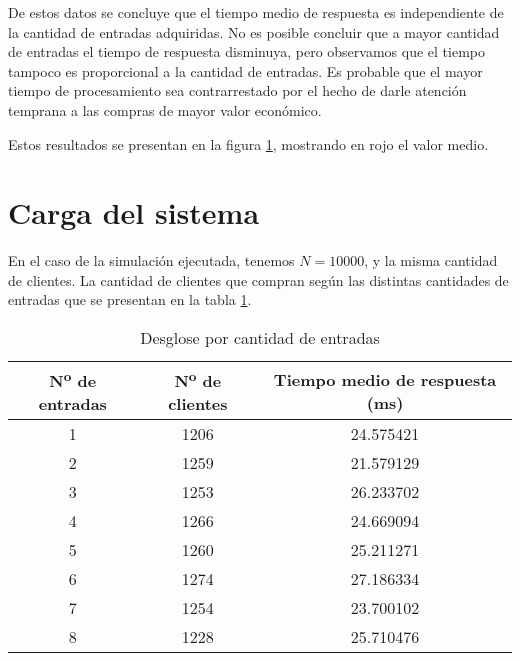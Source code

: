De estos datos se concluye que el tiempo medio de respuesta es independiente de la cantidad de entradas adquiridas.
No es posible concluir que a mayor cantidad de entradas el tiempo de respuesta disminuya, pero observamos que el tiempo tampoco es proporcional a la cantidad de entradas.
Es probable que el mayor tiempo de procesamiento sea contrarrestado por el hecho de darle atención temprana a las compras de mayor valor económico.

Estos resultados se presentan en la figura \ref{fig:respuesta_concurrente}, mostrando en rojo el valor medio.

\begin{figure}[H]
\label{fig:respuesta_concurrente}
\end{figure}

\section{Carga del sistema}

En el caso de la simulación ejecutada, tenemos \(N = 10000\), y la misma cantidad de clientes. La cantidad de clientes que compran según
las distintas cantidades de entradas que se presentan en la tabla \ref{table:carga}.

\begin{table}[H]
\centering
\begin{tabular}{ccc}
	N\textsuperscript{o} de entradas & N\textsuperscript{o} de clientes & Tiempo medio de respuesta (ms)  \\
\hline
1                 & 1206 &            24.575421 \\
2                 & 1259 &            21.579129 \\
3                 & 1253 &            26.233702 \\
4                 & 1266 &            24.669094 \\
5                 & 1260 &            25.211271 \\
6                 & 1274 &            27.186334 \\
7                 & 1254 &            23.700102 \\
8                 & 1228 &            25.710476 \\
\end{tabular}
\caption{Desglose por cantidad de entradas}
\label{table:carga}
\end{table}

